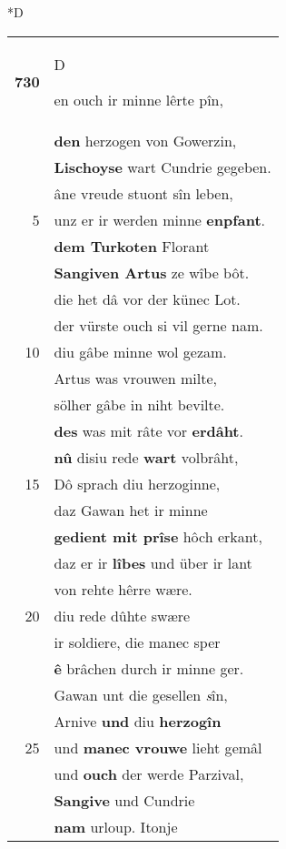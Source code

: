 \documentclass[8pt,a4paper,notitlepage]{article}
\begin{document}
\begin{table}[ht]
\begin{minipage}[t]{0.5\linewidth}
\small
\begin{center}*D
\end{center}
\begin{tabular}{rl}
\textbf{730} & \begin{large}D\end{large}en ouch ir minne lêrte pîn,\\ 
 & \textbf{den} herzogen von Gowerzin,\\ 
 & \textbf{Lischoyse} wart Cundrie gegeben.\\ 
 & âne vreude stuont sîn leben,\\ 
5 & unz er ir werden minne \textbf{enpfant}.\\ 
 & \textbf{dem Turkoten} Florant\\ 
 & \textbf{\textbf{Sangiven} Artus} ze wîbe bôt.\\ 
 & die het dâ vor der künec Lot.\\ 
 & der vürste ouch si vil gerne nam.\\ 
10 & diu gâbe minne wol gezam.\\ 
 & Artus was vrouwen milte,\\ 
 & sölher gâbe in niht bevilte.\\ 
 & \textbf{des} was mit râte vor \textbf{erdâht}.\\ 
 & \textbf{nû} disiu rede \textbf{wart} volbrâht,\\ 
15 & Dô sprach diu herzoginne,\\ 
 & daz Gawan het ir minne\\ 
 & \textbf{gedient mit prîse} hôch erkant,\\ 
 & daz er ir \textbf{lîbes} und über ir lant\\ 
 & von rehte hêrre wære.\\ 
20 & diu rede dûhte swære\\ 
 & ir soldiere, die manec sper\\ 
 & \textbf{ê} brâchen durch ir minne ger.\\ 
 & Gawan unt die gesellen \textit{s}în,\\ 
 & Arnive \textbf{und} diu \textbf{herzogîn}\\ 
25 & und \textbf{manec vrouwe} lieht gemâl\\ 
 & und \textbf{ouch} der werde Parzival,\\ 
 & \textbf{Sangive} und Cundrie\\ 
 & \textbf{nam} urloup. Itonje\\ 

\end{tabular}
\end{minipage}
\end{table}
\end{document}

